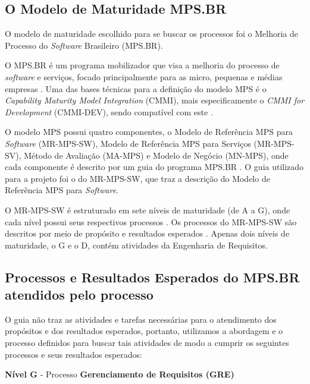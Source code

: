       
   \subsection{O Modelo de Maturidade MPS.BR}
        
      O modelo de maturidade escolhido para se buscar os processos foi o Melhoria de Processo do \textit{Software} Brasileiro (MPS.BR).
      
      O MPS.BR é um programa mobilizador que visa a melhoria do processo de \textit{software} e serviços, focado principalmente
      para as micro, pequenas e médias empresas \cite{softex12}.
      Uma das bases técnicas para a definição do modelo MPS é o \textit{Capability Maturity Model Integration} (CMMI), mais especificamente
      o \textit{CMMI for Development} (CMMI-DEV\textregistered), sendo compatível com este \cite{softex12}.
      
      O modelo MPS possui quatro componentes, o Modelo de Referência MPS para \textit{Software} (MR-MPS-SW), Modelo de Referência MPS para
      Serviços (MR-MPS-SV), Método de Avaliação (MA-MPS) e Modelo de Negócio (MN-MPS), onde cada componente é descrito por um guia
      do programa MPS.BR \cite{softex12}.
      O guia utilizado para a projeto foi o do MR-MPS-SW, que traz a descrição do Modelo de Referência MPS para \textit{Software}.
      
      O MR-MPS-SW é estruturado em sete níveis de maturidade (de A a G), onde cada nível possui seus respectivos processos \cite{softex12}.
      Os processos do MR-MPS-SW são descritos por meio de propósito e resultados esperados \cite{softex12}.
      Apenas dois níveis de maturidade, o G e o D, contém atividades da Engenharia de Requisitos.
      
    \subsection{Processos e Resultados Esperados do MPS.BR atendidos pelo processo}
    
      O guia não traz as atividades e tarefas necessárias para o atendimento dos propósitos e dos resultados esperados, portanto,
      utilizamos a abordagem e o processo definidos para buscar tais atividades de modo a cumprir os seguintes processos
      e seus resultados esperados:\linebreak
      
      \noindent
      \textbf{Nível G} - Processo \textbf{Gerenciamento de Requisitos (GRE)}
	  
